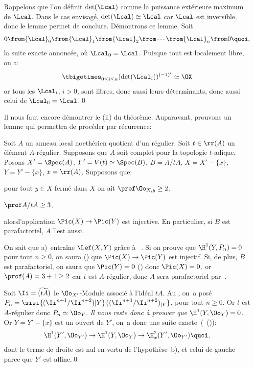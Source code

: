 Rappelons que l'on d\'efinit $\det({\Lcal})$ comme la puissance ext\'erieure maximum de ${\Lcal}$. Dans le cas envisag\'e, $\det({\Lcal}) \simeq{\Lcal}$ car ${\Lcal}$ est inversible, donc le lemme permet de conclure. D\'emontrons ce lemme. Soit
\[
0\from {\Lcal}_0\from {\Lcal}_1\from {\Lcal}_2\from\cdots\from{\Lcal}_n\from 0{\quoi},
\]
la suite exacte annonc\'ee, o\`u ${\Lcal}_0={\Lcal}$. Puisque tout est localement libre, on a:
\[
\tbigotimes_{0\leq i\leq n}(\det({\Lcal}_i))^{(-1)^i} \simeq \OX
\]
or tous les ${\Lcal}_i$, $i>0$, sont libres, donc aussi leurs d\'eterminants, donc aussi celui de ${\Lcal}_0 = {\Lcal}$.\qed

\medskip
Il nous faut encore d\'emontrer le (ii) du th\'eor\`eme. Auparavant, prouvons un lemme qui permettra de proc\'eder par r\'ecurrence:

\begin{lemme} \label{XI.3.16}
Soit $A$ un anneau local noeth\'erien quotient d'un r\'egulier. Soit $t\in\rr(A)$ un \'el\'ement $A$-r\'egulier. Supposons que $A$ soit complet pour la topologie $t$-adique. Posons $X'=\Spec(A)$, $Y'=V(t)\simeq \Spec(B)$, $B=A/tA$, $X=X'-\{x\}$, $Y=Y'-\{x\}$, $x=\rr(A)$. Supposons que:
\begin{enumeratea}
\item
pour tout $y\in X$ ferm\'e dans $X$ on ait $\prof\Oo_{X, y}\geq 2$,
\item
$\prof A/tA\geq 3$,
\end{enumeratea}
\noindent
alors\pageoriginale l'application $\Pic(X)\to\Pic(Y)$ est injective. En particulier, si $B$ est parafactoriel, $A$ l'est aussi.
\end{lemme}

On sait que a)~entra\^ine $\Lef(X, Y)$ gr\^ace \`a ~. Si on prouve que $\H^1(Y, P_n)=0$ pour tout $n\geq 0$, on saura  () que $\Pic(X)\to\Pic(Y)$ est injectif. Si, de plus, $B$ est parafactoriel, on saura que $\Pic(Y)=0$ () donc $\Pic(X)=0$, or $\prof(A)=3+1\geq 2$ car $t$ est $A$-r\'egulier, donc $A$ sera parafactoriel par~.

Soit $\Ii=\widetilde{(tA)}$ le $\Oo_{X'}$-Module associ\'e \`a l'id\'eal $tA$. Au \numero {}, on~a pos\'e $P_n = \sisi{(\Ii^{n+1}/\Ii^{n+2}){|Y}}{(\Ii^{n+1}/\Ii^{n+2})_{|Y}}$, pour tout $n\geq 0$. Or $t$ est $A$-r\'egulier donc $P_n\simeq \Oo_Y$. \emph{Il nous reste donc \`a prouver que $\H^1(Y, \Oo_Y)=0$.} Or $Y = Y'-\{x\}$ est un ouvert de $Y'$, on~a donc une suite exacte~(~()):
\[
\H^1(Y', \Oo_{Y'})\to\H^1(Y, \Oo_{Y})\to\H^2_x(Y', \Oo_{Y'}){\quoi},
\]
dont le terme de droite est nul en vertu de l'hypoth\`ese~b), et celui de gauche parce que $Y'$ est affine.\qed

